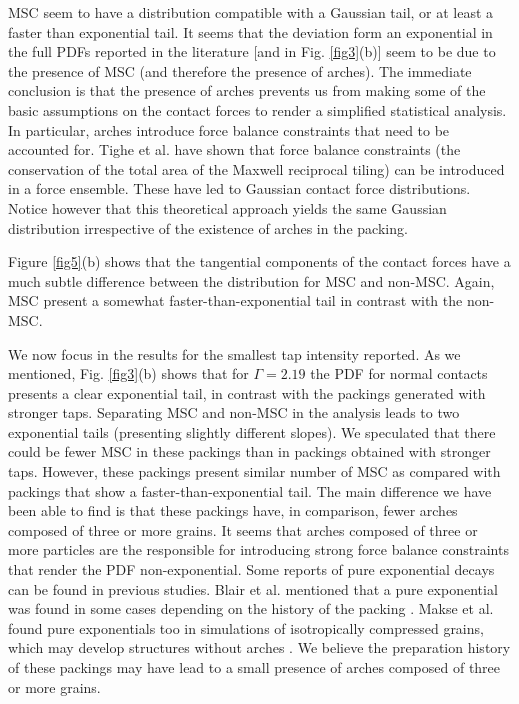MSC seem to have a distribution compatible with a Gaussian tail, or at least a faster than exponential tail. It seems that the deviation form an exponential in the full PDFs reported in the literature [and in Fig. \ref{fig3}(b)] seem to be due to the presence of MSC (and therefore the presence of arches). The immediate conclusion is that the presence of arches prevents us from making some of the basic assumptions on the contact forces to render a simplified statistical analysis. In particular, arches introduce force balance constraints that need to be accounted for. Tighe et al. \cite{tighe} have shown that force balance constraints (the conservation of the total area of the Maxwell reciprocal tiling) can be introduced in a force ensemble. These have led to Gaussian contact force distributions. Notice however that this theoretical approach yields the same Gaussian distribution irrespective of the existence of arches in the packing.

Figure \ref{fig5}(b) shows that the tangential components of the contact forces have a much subtle difference between the distribution for MSC and non-MSC. Again, MSC present a somewhat faster-than-exponential tail in contrast with the non-MSC.

We now focus in the results for the smallest tap intensity reported. As we mentioned, Fig. \ref{fig3}(b) shows that for $\Gamma=2.19$ the PDF for normal contacts presents a clear exponential tail, in contrast with the packings generated with stronger taps. Separating MSC and non-MSC in the analysis leads to two exponential tails (presenting slightly different slopes). We speculated that there could be fewer MSC in these packings than in packings obtained with stronger taps. However, these packings present similar number of MSC as compared with packings that show a faster-than-exponential tail. The main difference we have been able to find is that these packings have, in comparison, fewer arches composed of three or more grains. It seems that arches composed of three or more particles are the responsible for introducing strong force balance constraints that render the PDF non-exponential. Some reports of pure exponential decays can be found in previous studies. Blair et al. mentioned that a pure exponential was found in some cases depending on the history of the packing \cite{blair}. Makse et al. found pure exponentials too in simulations of isotropically compressed grains, which may develop structures without arches \cite{makse}. We believe the preparation history of these packings may have lead to a small presence of arches composed of three or more grains.

